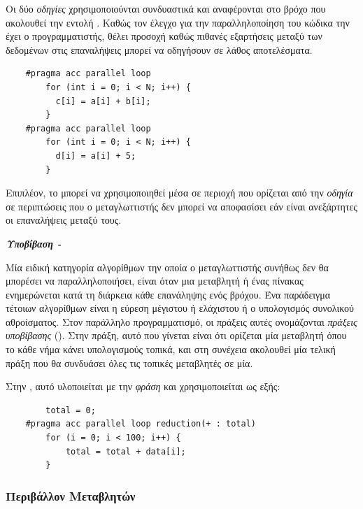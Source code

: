 Οι δύο \textit{οδηγίες} χρησιμοποιούνται συνδυαστικά και αναφέρονται στο βρόχο που ακολουθεί την εντολή . Καθώς τον έλεγχο για την παραλληλοποίηση του κώδικα την έχει ο προγραμματιστής, θέλει προσοχή καθώς πιθανές εξαρτήσεις μεταξύ των δεδομένων στις επαναλήψεις μπορεί να οδηγήσουν σε λάθος αποτελέσματα.
  
\begin{verbatim}
    #pragma acc parallel loop
        for (int i = 0; i < N; i++) {
          c[i] = a[i] + b[i];
        }
    #pragma acc parallel loop
        for (int i = 0; i < N; i++) {
          d[i] = a[i] + 5;
        }
\end{verbatim}

Επιπλέον, το  μπορεί να χρησιμοποιηθεί μέσα σε περιοχή που ορίζεται από την \textit{οδηγία}  σε περιπτώσεις που ο μεταγλωττιστής δεν μπορεί να αποφασίσει εάν είναι ανεξάρτητες οι επαναλήψεις μεταξύ τους.

\bigskip
\textbf{\textit{Υποβίβαση - }}
\medskip

Μία ειδική κατηγορία αλγορίθμων την οποία ο μεταγλωττιστής συνήθως δεν θα μπορέσει να παραλληλοποιήσει, είναι όταν μια μεταβλητή ή ένας πίνακας ενημερώνεται κατά τη διάρκεια κάθε επανάληψης ενός βρόχου. Ένα παράδειγμα τέτοιων αλγορίθμων είναι η εύρεση μέγιστου ή ελάχιστου ή ο υπολογισμός συνολικού αθροίσματος. Στον παράλληλο προγραμματισμό, οι πράξεις αυτές ονομάζονται \textit{πράξεις υποβίβασης} (). Στην πράξη, αυτό που γίνεται είναι ότι ορίζεται μία μεταβλητή όπου το κάθε νήμα κάνει υπολογισμούς τοπικά, και στη συνέχεια ακολουθεί μία τελική πράξη που θα συνδυάσει όλες τις τοπικές μεταβλητές σε μία. 

Στην , αυτό υλοποιείται με την \textit{φράση}  και χρησιμοποιείται ως εξής: 

\begin{verbatim}
        total = 0;
    #pragma acc parallel loop reduction(+ : total)
        for (i = 0; i < 100; i++) {
            total = total + data[i];
        }
\end{verbatim}

\subsubsection{Περιβάλλον Μεταβλητών}
 
